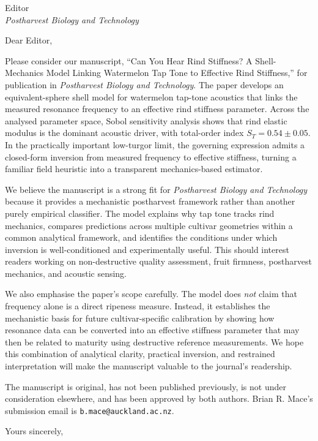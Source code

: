\documentclass[11pt]{letter}
\date{\today}
\begin{document}
\begin{letter}{%
Editor\\
\textit{Postharvest Biology and Technology}}

\opening{Dear Editor,}
\small

Please consider our manuscript, ``Can You Hear Rind Stiffness? A Shell-Mechanics Model Linking Watermelon Tap Tone to Effective Rind Stiffness,'' for publication in \textit{Postharvest Biology and Technology}. The paper develops an equivalent-sphere shell model for watermelon tap-tone acoustics that links the measured resonance frequency to an effective rind stiffness parameter. Across the analysed parameter space, Sobol sensitivity analysis shows that rind elastic modulus is the dominant acoustic driver, with total-order index $S_T = 0.54 \pm 0.05$. In the practically important low-turgor limit, the governing expression admits a closed-form inversion from measured frequency to effective stiffness, turning a familiar field heuristic into a transparent mechanics-based estimator.

We believe the manuscript is a strong fit for \textit{Postharvest Biology and Technology} because it provides a mechanistic postharvest framework rather than another purely empirical classifier. The model explains why tap tone tracks rind mechanics, compares predictions across multiple cultivar geometries within a common analytical framework, and identifies the conditions under which inversion is well-conditioned and experimentally useful. This should interest readers working on non-destructive quality assessment, fruit firmness, postharvest mechanics, and acoustic sensing.

We also emphasise the paper's scope carefully. The model does \emph{not} claim that frequency alone is a direct ripeness measure. Instead, it establishes the mechanistic basis for future cultivar-specific calibration by showing how resonance data can be converted into an effective stiffness parameter that may then be related to maturity using destructive reference measurements. We hope this combination of analytical clarity, practical inversion, and restrained interpretation will make the manuscript valuable to the journal's readership.

The manuscript is original, has not been published previously, is not under consideration elsewhere, and has been approved by both authors. Brian R. Mace's submission email is \texttt{b.mace@auckland.ac.nz}.

\closing{Yours sincerely,}

\end{letter}
\end{document}
